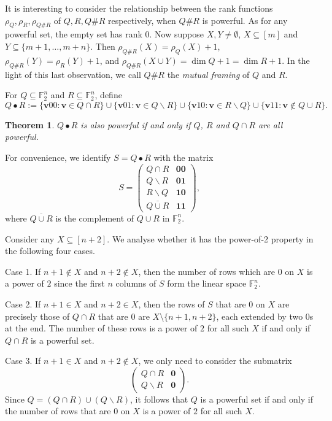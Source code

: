 \documentclass[12pt]{article}
\newtheorem{thm}{Theorem}[section]
\def\pf{\noindent {\it Proof.\ }}
\begin{document}
It is interesting to consider the relationship between the rank functions
$\rho_Q, \rho_R, \rho_{Q\#R}$ of $Q,R,Q\#R$ respectively, when $Q\#R$ is powerful.
As for any powerful set, the
empty set has rank 0.  Now suppose $X, Y\not=\emptyset$, $X\subseteq[m]$ and $Y\subseteq\{m+1,\ldots,m+n\}$.  Then $\rho_{Q\#R}(X)=\rho_Q(X)+1$, $\rho_{Q\#R}(Y)=\rho_R(Y)+1$,
and $\rho_{Q\#R}(X\cup Y)=\dim Q+1=\dim R+1$.
In the light of this last observation, we call
$Q\#R$ the \textit{mutual framing} of $Q$ and $R$.

For $Q\subseteq\mathbb{F}_2^{n}$ and $R\subseteq\mathbb{F}_2^{n}$, define
\[
Q\bullet R:=\{\mathbf{v}00: \mathbf{v}\in Q\cap R\}\cup\{\mathbf{v}01:\mathbf{v}\in Q\backslash R\}\cup\{\mathbf{v}10:\mathbf{v}\in R\backslash Q\}\cup\{\mathbf{v}11:\mathbf{v}\not\in Q\cup R\}.
\]

\begin{thm}\label{thmgen}
$Q\bullet R$ is also powerful if and only if
$Q$, $R$ and $Q\cap R$ are all powerful.
\end{thm}
\pf For convenience, we identify $S=Q\bullet R$ with the matrix
\begin{equation*}
S=\left(
\begin{array}{c|c}
Q\cap R             &\mathbf{0}\mathbf{0} \\[8pt]
Q\backslash R       &\mathbf{0}\mathbf{1} \\[8pt]
R\backslash Q       &\mathbf{1}\mathbf{0} \\[8pt]
\overline{Q\cup R}  &\mathbf{1}\mathbf{1}
\end{array}
\right),
\end{equation*}
where $\overline{Q\cup R}$ is the complement of $Q\cup R$ in $\mathbb{F}_2^n$.

Consider any $X\subseteq[n+2]$.  We analyse whether it has the power-of-2 property
in the following four cases.

Case 1. If $n+1\not\in X$ and $n+2\not\in X$, then the number of rows which are $0$ on $X$ is a power of $2$ since the first $n$ columns of $S$ form the linear space $\mathbb{F}_2^n$.

Case 2. If $n+1\in X$ and $n+2\in X$, then the rows of $S$ that are 0 on $X$ are precisely those of $Q\cap R$ that are $0$ are $X\setminus\{n+1,n+2\}$, each extended by two $0$s at the end.
The number of these rows is a power of $2$ for all such $X$
if and only if $Q\cap R$ is a powerful set.

Case 3. If $n+1\in X$ and $n+2\not\in X$, we only need to consider the submatrix
\begin{equation*}
\left(
\begin{array}{c|c}
Q\cap R             &\mathbf{0} \\[8pt]
Q\backslash R       &\mathbf{0}
\end{array}
\right).
\end{equation*}
Since $Q=(Q\cap R)\cup(Q\backslash R)$, it follows that
$Q$ is a powerful set if and only if the number of rows that are $0$ on $X$ is a power of $2$
for all such $X$.
\end{document}
